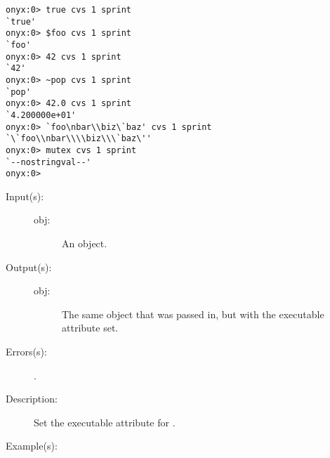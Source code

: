 \begin{description}
\begin{description}
\begin{verbatim}
onyx:0> true cvs 1 sprint
`true'
onyx:0> $foo cvs 1 sprint
`foo'
onyx:0> 42 cvs 1 sprint
`42'
onyx:0> ~pop cvs 1 sprint
`pop'
onyx:0> 42.0 cvs 1 sprint
`4.200000e+01'
onyx:0> `foo\nbar\\biz\`baz' cvs 1 sprint
`\`foo\\nbar\\\\biz\\\`baz\''
onyx:0> mutex cvs 1 sprint
`--nostringval--'
onyx:0>
		\end{verbatim}
	\end{description}
\label{systemdict:cvx}
\item[{\onyxop{obj}{cvx}{obj}}: ]
	\begin{description}\item[]
	\item[Input(s): ]
		\begin{description}\item[]
		\item[obj: ]
			An object.
		\end{description}
	\item[Output(s): ]
		\begin{description}\item[]
		\item[obj: ]
			The same object that was passed in, but with the
			executable attribute set.
		\end{description}
	\item[Errors(s): ]
		\begin{description}\item[]
		\item[.]
		\end{description}
	\item[Description: ]
		Set the executable attribute for .
	\item[Example(s): ]\begin{verbatim}


\end{verbatim}
\end{description}
\end{description}
